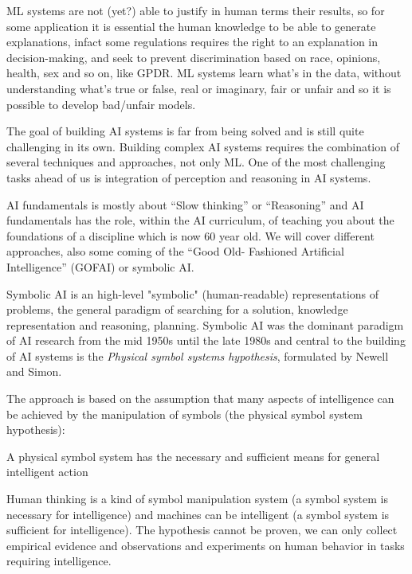 ML systems are not (yet?) able to justify in human terms their results, so for some application it is essential
the human knowledge to be able to generate explanations, infact some regulations requires the right
to an explanation in decision-making, and seek to prevent discrimination based on race, opinions,
health, sex and so on, like GPDR.\newline
ML systems learn what’s in the data, without understanding what's true or false, real or imaginary, 
fair or unfair and so it is possible to develop bad/unfair models.

The goal of building AI systems is far from being solved and is still quite challenging in its own.
Building complex AI systems requires the combination of several techniques and approaches, not only ML.\newline
One of the most challenging tasks ahead of us is integration of
perception and reasoning in AI systems.

AI fundamentals is mostly about “Slow thinking” or “Reasoning” and AI fundamentals has the role,
within the AI curriculum, of teaching you about the foundations of a discipline which is now 60 year old.\newline
We will cover different approaches, also some coming of the “Good Old-
Fashioned Artificial Intelligence” (GOFAI) or symbolic AI.

\begin{defi}
Symbolic AI is an high-level "symbolic" (human-readable) representations of problems, the 
general paradigm of searching for a solution, knowledge representation and reasoning, planning.\newline
Symbolic AI was the dominant paradigm of AI research from the mid 1950s until the late 1980s and 
central to the building of AI systems is the \emph{Physical symbol systems hypothesis}, formulated by Newell and Simon.
\end{defi}

The approach is based on the assumption that many aspects of intelligence can be achieved by the 
manipulation of symbols (the physical symbol system hypothesis):
\begin{defi}
A physical symbol system has the necessary and sufficient means for general intelligent action
\end{defi}%
Human thinking is a kind of symbol manipulation system (a symbol system is necessary for intelligence) and 
machines can be intelligent (a symbol system is sufficient for intelligence).\newline
The hypothesis cannot be proven, we can only collect empirical evidence and observations and experiments
on human behavior in tasks requiring intelligence.

